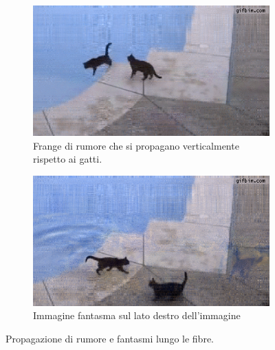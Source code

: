 \documentclass[11pt,a4paper]{article}
\begin{document}
\def\widFrame{0.62}
\def\wid{0.6}
\def\scal{0.5}
\begin{figure}
  \centering
  \begin{subfigure}[b]{\wid\textwidth}
    \centering
    \includegraphics[keepaspectratio=true, scale=\scal]{Imgs/Cats/frame-62}
    \caption{Frange di rumore che si propagano verticalmente rispetto ai gatti.}\label{fig:cats_noise_vertical}
  \end{subfigure}
  
  \begin{subfigure}[b]{\wid\textwidth}
    \centering
    \includegraphics[keepaspectratio=true, scale=\scal]{Imgs/Cats/frame-94}
    \caption{Immagine fantasma sul lato destro dell'immagine}\label{fig:cats_noise_time}
  \end{subfigure}
  \caption{Propagazione di rumore e fantasmi lungo le fibre.}\label{fig:cats_noise}
\end{figure}

  
\end{document}

